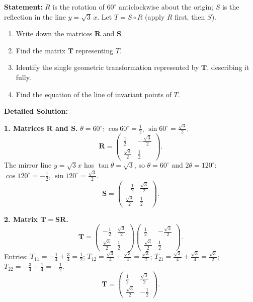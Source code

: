 \documentclass[11pt]{article}
\begin{document}
\begin{exoresolu}
\textbf{Statement:} $R$ is the rotation of $60^\circ$ anticlockwise about the origin; $S$ is the reflection in the line $y = \sqrt{3}\,x$. Let $T = S \circ R$ (apply $R$ first, then $S$).
\begin{enumerate}
    \item Write down the matrices $\mathbf{R}$ and $\mathbf{S}$.
    \item Find the matrix $\mathbf{T}$ representing $T$.
    \item Identify the single geometric transformation represented by $\mathbf{T}$, describing it fully.
    \item Find the equation of the line of invariant points of $T$.
\end{enumerate}

\tcblower
\textbf{Detailed Solution:}

\textbf{1. Matrices $\mathbf{R}$ and $\mathbf{S}$.}
$\theta = 60^\circ$: $\cos 60^\circ = \tfrac12$, $\sin 60^\circ = \tfrac{\sqrt3}{2}$.
\[
\mathbf{R} = \begin{pmatrix} \frac{1}{2} & -\frac{\sqrt{3}}{2} \\[2pt] \frac{\sqrt{3}}{2} & \frac{1}{2} \end{pmatrix}.
\]
The mirror line $y = \sqrt{3}x$ has $\tan\theta = \sqrt{3}$, so $\theta = 60^\circ$ and $2\theta = 120^\circ$: $\cos 120^\circ = -\tfrac12$, $\sin 120^\circ = \tfrac{\sqrt3}{2}$.
\[
\mathbf{S} = \begin{pmatrix} -\frac{1}{2} & \frac{\sqrt{3}}{2} \\[2pt] \frac{\sqrt{3}}{2} & \frac{1}{2} \end{pmatrix}.
\]

\textbf{2. Matrix $\mathbf{T} = \mathbf{S}\mathbf{R}$.}
\[
\mathbf{T} = \begin{pmatrix} -\frac{1}{2} & \frac{\sqrt{3}}{2} \\[2pt] \frac{\sqrt{3}}{2} & \frac{1}{2} \end{pmatrix} \begin{pmatrix} \frac{1}{2} & -\frac{\sqrt{3}}{2} \\[2pt] \frac{\sqrt{3}}{2} & \frac{1}{2} \end{pmatrix}.
\]
Entries:
$T_{11} = -\frac{1}{4} + \frac{3}{4} = \frac{1}{2}$;\quad
$T_{12} = \frac{\sqrt{3}}{4} + \frac{\sqrt{3}}{4} = \frac{\sqrt{3}}{2}$;\quad
$T_{21} = \frac{\sqrt{3}}{4} + \frac{\sqrt{3}}{4} = \frac{\sqrt{3}}{2}$;\quad
$T_{22} = -\frac{3}{4} + \frac{1}{4} = -\frac{1}{2}$.
\[
\mathbf{T} = \begin{pmatrix} \frac{1}{2} & \frac{\sqrt{3}}{2} \\[2pt] \frac{\sqrt{3}}{2} & -\frac{1}{2} \end{pmatrix}.
\]


\end{exoresolu}
\end{document}
